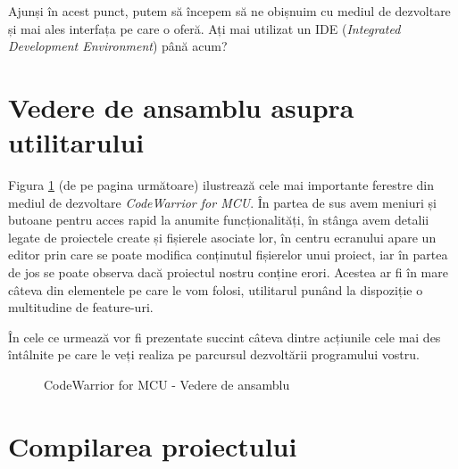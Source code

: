Ajunși în acest punct, putem să începem să ne obișnuim cu mediul de dezvoltare și mai ales interfața pe care o oferă. Ați mai utilizat un IDE (\textit{Integrated Development Environment}) până acum?

\section{Vedere de ansamblu asupra utilitarului}

Figura \ref{fig:CodeWarrior-VedereDeAnsamblu} (de pe pagina următoare) ilustrează cele mai importante ferestre din mediul de dezvoltare \textit{CodeWarrior for MCU}. În partea de sus avem meniuri și butoane pentru acces rapid la anumite funcționalități, în stânga avem detalii legate de proiectele create și fișierele asociate lor, în centru ecranului apare un editor prin care se poate modifica conținutul fișierelor unui proiect, iar în partea de jos se poate observa dacă proiectul nostru conține erori. Acestea ar fi în mare câteva din elementele pe care le vom folosi, utilitarul punând la dispoziție o multitudine de feature-uri.

În cele ce urmează vor fi prezentate succint câteva dintre acțiunile cele mai des întâlnite pe care le veți realiza pe parcursul dezvoltării programului vostru.

\begin{figure}[h!]
    \vspace{-15pt}
    \vspace{-20pt}
    \caption{\label{fig:CodeWarrior-VedereDeAnsamblu} CodeWarrior for MCU - Vedere de ansamblu}
    \vspace{-10pt}
\end{figure}

\section{Compilarea proiectului}

